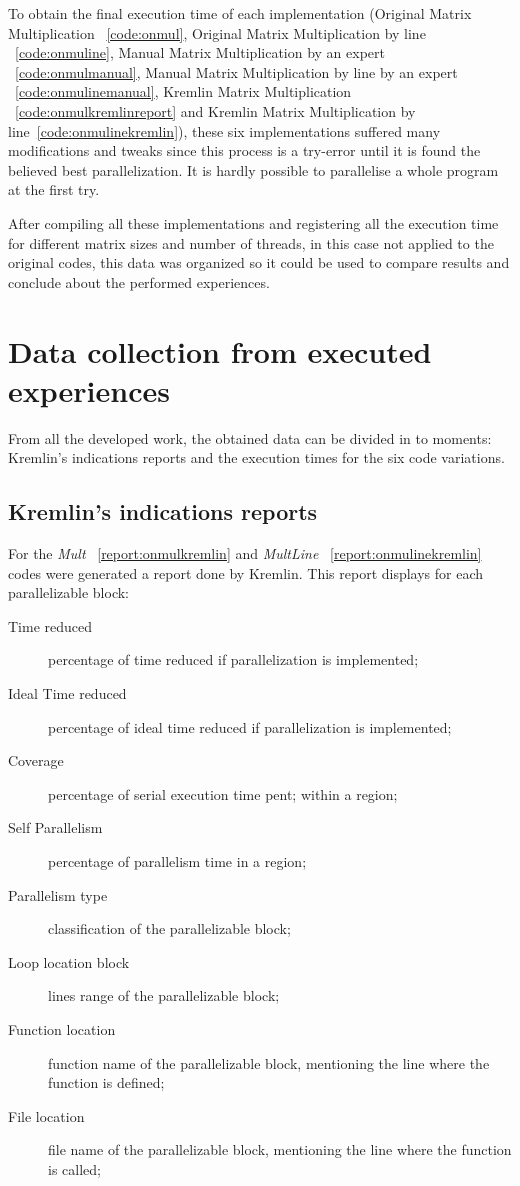 To obtain the final execution time of each implementation (Original Matrix Multiplication ~\ref{code:onmul}, Original Matrix Multiplication by line ~\ref{code:onmuline}, Manual Matrix Multiplication by an expert ~\ref{code:onmulmanual}, Manual Matrix Multiplication by line by an expert ~\ref{code:onmulinemanual}, Kremlin Matrix Multiplication ~\ref{code:onmulkremlinreport} and Kremlin Matrix Multiplication by line~\ref{code:onmulinekremlin}), these six implementations suffered many modifications and tweaks since this process is a try-error until it is found the believed best parallelization. It is hardly possible to parallelise a whole program at the first try.

After compiling all these implementations and registering all the execution time for different matrix sizes and number of threads, in this case not applied to the original codes, this data was organized so it could be used to compare results and conclude about the performed experiences.

\section{Data collection from executed experiences}

From all the developed work, the obtained data can be divided in to moments: Kremlin's indications reports and the execution times for the six code variations.

\subsection{Kremlin's indications reports} 

For the \textit{Mult} ~\ref{report:onmulkremlin} and \textit{MultLine} ~\ref{report:onmulinekremlin} codes were generated a report done by Kremlin. This report displays for each parallelizable block:

\begin{description}
	\item[Time reduced] percentage of time reduced if parallelization is implemented;
	\item[Ideal Time reduced] percentage of  ideal time reduced if parallelization is implemented;
	\item[Coverage] percentage of serial execution time pent; within a region;
	\item[Self Parallelism] percentage of parallelism time in a region;
	\item[Parallelism type] classification of the parallelizable block;
	\item[Loop location block] lines range of the parallelizable block;
	\item[Function location] function name of the parallelizable block, mentioning the line where the function is defined;
	\item[File location] file name of the parallelizable block, mentioning the line where the function is called;
\end{description}


